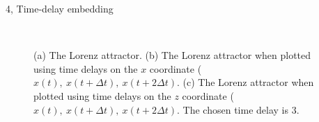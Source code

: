 \documentclass[10pt,a4paper]{article}
\begin{document}
\begin{task}{4, Time-delay embedding}
\begin{figure}[H]
    \centering
    \\
    \hfill
    \caption{(a) The Lorenz attractor.
    (b) The Lorenz attractor when plotted using time delays on the $x$ coordinate ($x(t),\ x(t + \Delta t),\ x(t + 2 \Delta t)$.
    (c) The Lorenz attractor when plotted using time delays on the $z$ coordinate ($x(t),\ x(t + \Delta t),\ x(t + 2 \Delta t)$.
    The chosen time delay is 3.}
    \label{fig:lorenz-takens}
\end{figure}


\end{task}
\end{document}
